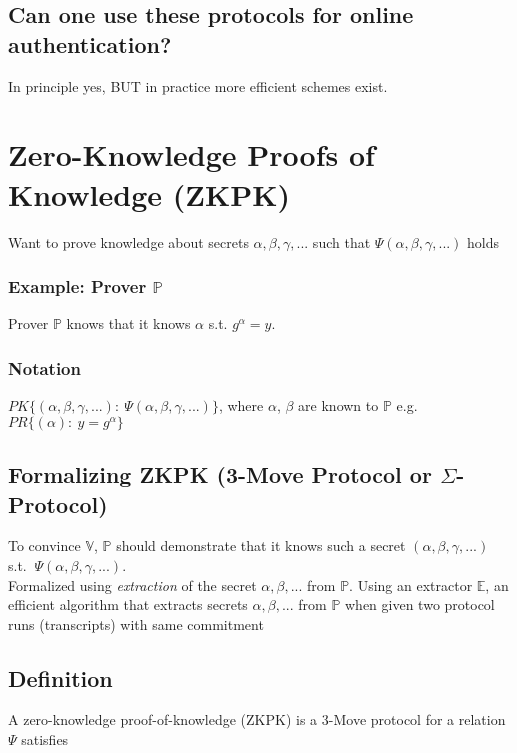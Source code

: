 \documentclass{report}
\begin{document}
		\subsection{Can one use these protocols for online authentication?}
		\startsubsection
			In principle yes, BUT in practice more efficient schemes exist.
		\closesection
	\closesection
	
	\section{Zero-Knowledge Proofs of Knowledge (ZKPK)}
	\startsection
		Want to prove knowledge about secrets $\alpha, \beta, \gamma, ...$ such that $\Psi (\alpha, \beta, \gamma, ...)$ holds
		\subsubsection{Example: Prover $\mathbb{P}$}
		\startsubsection
			Prover $\mathbb{P}$ knows that it knows $\alpha$ s.t. $g^{\alpha} = y$.
		\closesection
		\subsubsection{Notation}
		\startsubsection
			$PK \{ (\alpha, \beta, \gamma, ...): \ \Psi (\alpha, \beta, \gamma, ...)\}$, where $\alpha$, $\beta$ are known to $\mathbb{P}$ e.g. $PR\{ (\alpha): \ y = g^{\alpha} \} $
		\closesection
		\subsection{Formalizing ZKPK (3-Move Protocol or $\Sigma$-Protocol)}
		\startsection
			\begin{tikzpicture}
			\end{tikzpicture}
			To convince $\mathbb{V}$, $\mathbb{P}$ should demonstrate that it knows such a secret $(\alpha, \beta, \gamma, ...)$ s.t. $\ \Psi (\alpha, \beta, \gamma, ...)$. \\
			Formalized using \textit{extraction} of the secret $\alpha, \beta, ...$ from $\mathbb{P}$. Using an extractor $\mathbb{E}$, an efficient algorithm that extracts secrets $\alpha, \beta, ...$ from $\mathbb{P}$ when given two protocol runs (transcripts) with same commitment
		\closesection
		\subsection{Definition}
		\startsubsection
			A zero-knowledge proof-of-knowledge (ZKPK) is a 3-Move protocol for a relation $\Psi$ satisfies
\end{document}
